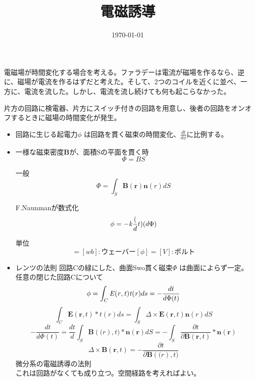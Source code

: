 \documentclass{jsarticle}
\title{電磁誘導}
\date{\today}
\begin{document}
\maketitle

\section{}
\subsection{}
	電磁場が時間変化する場合を考える。ファラデーは電流が磁場を作るなら、逆に、磁場が電流を作るはずだと考えた。そして、2つのコイルを近くに並べ、一方に、電流を流した。しかし、電流を流し続けても何も起こらなかった。
	
	片方の回路に検電器、片方にスイッチ付きの回路を用意し、後者の回路をオンオフするときに磁場の時間変化が発生。

\begin{itemize}
	\item 回路に生じる起電力$\phi$ は回路を貫く磁束の時間変化、$\frac{dt}{d\phi}$に比例する。
	
	\item 一様な磁束密度{\bf B}が、面積Sの平面を貫く時
	 	\begin{equation}
		 	\Phi=BS
		\end{equation}
										
		一般
		\begin{equation}
			\Phi=\int_S \bm{B} (\bm{r}) \bm{n} (r)dS
		\end{equation}
	
		F.Naunmanが数式化
		\begin{equation}
			\phi=-{\it k} \frac(dt)(d\Phi)
		\end{equation}
	
		単位
		\begin{equation}
			[\Phi]=[wb] :ウェーバー[\phi]=[V] :ボルト
		\end{equation}
	
	\item レンツの法則
		回路Cの緑にした、曲面Swo貫く磁束$\Phi$ は曲面によらず一定。\\
		任意の閉じた回路Cについて
		\begin{equation}
			\phi=\int_C {\it E(r, t)t(r)} ds = -\frac{dt}{d\Phi(t)}
		\end{equation}
		\begin{equation}
			\int_C \bm{E}(\bm{r},t)*t(r) ds = \int_S \Delta \times \bm{E}(\bm{r},t) \bm{n}(r) dS
		\end{equation}
		\begin{equation}
			-\frac{dt}{d\Phi(t)}=\frac{dt}{d}\int_S \bm{B}(\bm(r),t)*\bm{n}(\bm{r}) dS 
			             =-\int_S \frac{\partial t}{\partial \bm{B}(\bm{r},t)}*\bm{n}(\bm{r})
		\end{equation}
		\begin{equation}
			\Delta \times \bm{B}(\bm{r},t) = -\frac{\partial t}{\partial \bm{B}(\bm(r),t)}
		\end{equation}
		微分系の電磁誘導の法則\\
		これは回路がなくても成り立つ。空間経路を考えればよい。
\end{itemize}		
\end{document}
